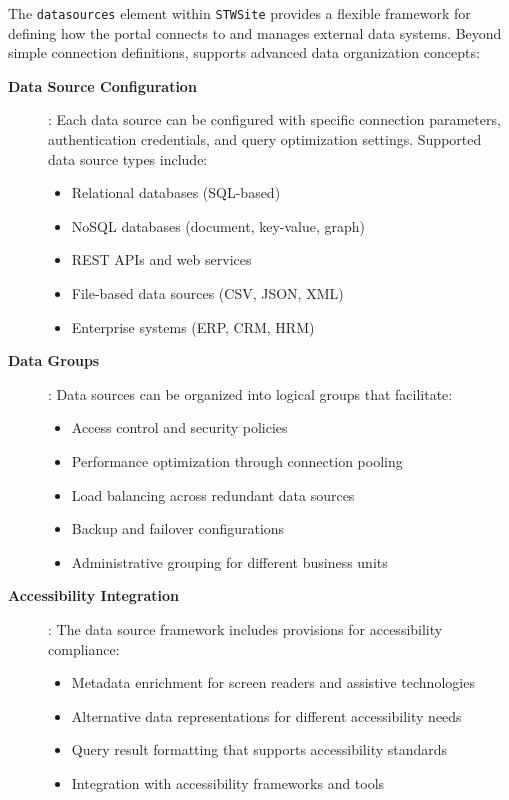 The \texttt{datasources} element within \texttt{STWSite} provides a flexible framework for defining how the portal connects to and manages external data systems. Beyond simple connection definitions, \wbdl{} supports advanced data organization concepts:

\begin{description}
\item[\textbf{Data Source Configuration}]: Each data source can be configured with specific connection parameters, authentication credentials, and query optimization settings. Supported data source types include:
\begin{itemize}
\item Relational databases (SQL-based)
\item NoSQL databases (document, key-value, graph)
\item REST APIs and web services
\item File-based data sources (CSV, JSON, XML)
\item Enterprise systems (ERP, CRM, HRM)
\end{itemize}

\item[\textbf{Data Groups}]: Data sources can be organized into logical groups that facilitate:
\begin{itemize}
\item Access control and security policies
\item Performance optimization through connection pooling
\item Load balancing across redundant data sources
\item Backup and failover configurations
\item Administrative grouping for different business units
\end{itemize}

\item[\textbf{Accessibility Integration}]: The data source framework includes provisions for accessibility compliance:
\begin{itemize}
\item Metadata enrichment for screen readers and assistive technologies
\item Alternative data representations for different accessibility needs
\item Query result formatting that supports accessibility standards
\item Integration with accessibility frameworks and tools
\end{itemize}
\end{description}

